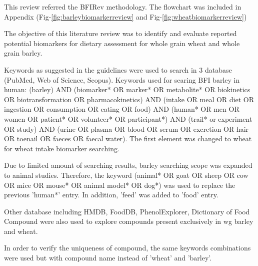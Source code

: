 This review referred the BFIRev methodology\cite{Pratico2018}. The flowchart was included in Appendix (Fig-\ref{fig:barleybiomarkerreview} and Fig-\ref{fig:wheatbiomarkerreview})

The objective of this literature review was to identify and evaluate reported potential biomarkers for dietary assessment for whole grain wheat and whole grain barley.

Keywords as suggested in the guidelines\cite{Pratico2018} were used to search in 3 database (PubMed, Web of Science, Scopus). Keywords used for searing BFI barley in human: 
(barley) AND (biomarker* OR marker* OR metabolite* OR biokinetics OR biotransformation OR pharmacokinetics) AND (intake OR meal OR diet OR ingestion OR consumption OR eating OR food) AND 
(human* OR men OR women OR patient* OR volunteer* OR participant*) AND 
(trail* or experiment OR study) AND (urine OR plasma OR blood OR serum OR excretion OR hair OR toenail OR faeces OR faecal water). The first element was changed to wheat for wheat intake biomarker searching. 

Due to limited amount of searching results, barley searching scope was expanded to animal studies. Therefore, the keyword (animal* OR goat OR sheep OR cow OR mice OR mouse* OR animal model* OR dog*) was used to replace the previous 'human*' entry. In addition, 'feed' was added to 'food' entry.

Other database including HMDB\cite{hmdb}, FoodDB\cite{foodb}, PhenolExplorer\cite{phenolexplorer}, Dictionary of Food Compound\cite{dictionary} were also used to explore compounds present exclusively in \acrshort{wg} barley and wheat. 

In order to verify the uniqueness of compound, the same keywords combinations were used but with compound name instead of 'wheat' and 'barley'.